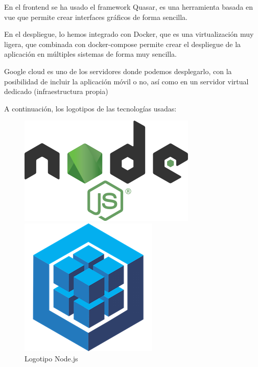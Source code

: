 \documentclass[11pt,spanish,listoffigures,listoftables]{tfgetsinf}
\begin{document}
En el frontend se ha usado el framework Quasar, es una herramienta basada en vue que permite crear interfaces gráficos de forma sencilla.

En el despliegue, lo hemos integrado con Docker, que es una virtualización muy ligera, que combinada con docker-compose permite crear el despliegue de la aplicación en múltiples sistemas de forma muy sencilla.

Google cloud es uno de los servidores donde podemos desplegarlo, con la posibilidad de incluir la aplicación móvil o no, así como en un servidor virtual dedicado (infraestructura propia)

A continuación, los logotipos de las tecnologías usadas:

\begin{figure}[!htb]
     \includegraphics[width=\linewidth]{img/Node.js_logo.png}
     \caption{Logotipo Node.js}\label{fig:LogoNode}
   \endminipage\hfill
     \includegraphics[width=\linewidth]{img/Sequelize_logo.png}

\end{figure}
\end{document}
